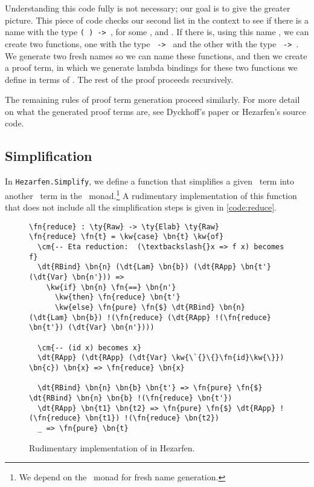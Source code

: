 Understanding this code fully is not necessary; our goal is to give the greater
picture. This piece of code checks our second list in the context to see if
there is a name with the type \texttt{(  ) -> },
for some ,  and . If there is, using this name , we can
create two functions, one with the type \texttt{ -> } and the other
with the type \texttt{ -> }. We generate two fresh names so we can
name these functions, and then we create a proof term, in which we generate
lambda bindings for these two functions we define in terms of . The rest
of the proof proceeds recursively.

The remaining rules of proof term generation proceed similarly. For more detail
on what the generated proof terms are, see Dyckhoff's paper or Hezarfen's
source code.


\subsection{Simplification}

In \texttt{Hezarfen.Simplify}, we define a function  that simplifies
a given \Raw\ term into another \Raw\ term in the \Elab\ monad.\footnote{We
depend on the \Elab\ monad for fresh name generation.}
A rudimentary implementation of this function that does not include all the
simplification steps is given in \autoref{code:reduce}.

\begin{figure}[H]
\caption{Rudimentary implementation of  in Hezarfen.}
\begin{Verbatim}[framesep=2mm, label=\footnotesize{\normalfont{Idris}}, labelposition=topline]
\fn{reduce} : \ty{Raw} -> \ty{Elab} \ty{Raw}
\fn{reduce} \fn{t} = \kw{case} \bn{t} \kw{of}
  \cm{-- Eta reduction:  (\textbackslash{}x => f x) becomes f}
  \dt{RBind} \bn{n} (\dt{Lam} \bn{b}) (\dt{RApp} \bn{t'} (\dt{Var} \bn{n'})) =>
    \kw{if} \bn{n} \fn{==} \bn{n'}
      \kw{then} \fn{reduce} \bn{t'}
      \kw{else} \fn{pure} \fn{$} \dt{RBind} \bn{n} (\dt{Lam} \bn{b}) !(\fn{reduce} (\dt{RApp} !(\fn{reduce} \bn{t'}) (\dt{Var} \bn{n'})))

  \cm{-- (id x) becomes x}
  \dt{RApp} (\dt{RApp} (\dt{Var} \kw{\`{}\{}\fn{id}\kw{\}}) \bn{c}) \bn{x} => \fn{reduce} \bn{x}

  \dt{RBind} \bn{n} \bn{b} \bn{t'} => \fn{pure} \fn{$} \dt{RBind} \bn{n} \bn{b} !(\fn{reduce} \bn{t'})
  \dt{RApp} \bn{t1} \bn{t2} => \fn{pure} \fn{$} \dt{RApp} !(\fn{reduce} \bn{t1}) !(\fn{reduce} \bn{t2})
  _ => \fn{pure} \bn{t}
\end{Verbatim}
\end{figure}

